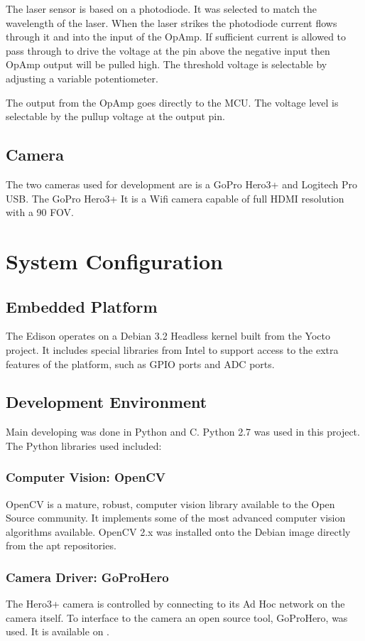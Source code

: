 \documentclass[botnum, fleqn]{unmeethesis}
\begin{document}
The laser sensor is based on a photodiode. It was selected to match the wavelength of the laser. When the laser strikes the photodiode current flows through it and into the input of the OpAmp. If sufficient current is allowed to pass through to drive the voltage at the pin above the negative input then OpAmp output will be pulled high. The threshold voltage is selectable by adjusting a variable potentiometer. 

The output from the OpAmp goes directly to the MCU. The voltage level is selectable by the pullup voltage at the output pin.

\subsection*{Camera}
The two cameras used for development are is a GoPro Hero3+ and Logitech Pro USB. The GoPro Hero3+ It is a Wifi camera capable of full HDMI resolution with a 90 FOV. 

\section*{System Configuration}

\subsection*{Embedded Platform}
The Edison operates on a Debian 3.2 Headless kernel built from the Yocto project. It includes special libraries from Intel to support access to the extra features of the platform, such as GPIO ports and ADC ports. 

\subsection*{Development Environment}
Main developing was done in Python and C. Python 2.7 was used in this project. The Python libraries used included:

\subsubsection*{Computer Vision: OpenCV}
OpenCV is a mature, robust, computer vision library available to the Open Source community. It implements some of the most advanced computer vision algorithms available. OpenCV 2.x was installed onto the Debian image directly from the apt repositories.
\subsubsection*{Camera Driver: GoProHero}
The Hero3+ camera is controlled by connecting to its Ad Hoc network on the camera itself. To interface to the camera an open source tool, GoProHero, was used. It is available on \cite{goprohero}.
\end{document}

